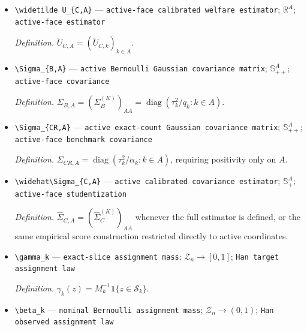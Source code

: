 \documentclass{article}
\begin{document}
\begin{itemize}
  \par\smallskip\noindent\emph{Definition.} \(\widetilde U_C=(\widetilde U_{C,1},\ldots,\widetilde U_{C,K})\).
  \item \texttt{\textbackslash{}\allowbreak{}widetilde U\_\allowbreak{}\{C,\allowbreak{}A\}\allowbreak{}} --- \texttt{active-\allowbreak{}face calibrated welfare estimator}; \(\mathbb R^A\); \texttt{active-\allowbreak{}face estimator}
  \par\smallskip\noindent\emph{Definition.} \(\widetilde U_{C,A}=(\widetilde U_{C,k})_{k\in A}\).
  \item \texttt{\textbackslash{}\allowbreak{}Sigma\_\allowbreak{}\{B,\allowbreak{}A\}\allowbreak{}} --- \texttt{active Bernoulli Gaussian covariance matrix}; \(\mathbb S_{++}^A\); \texttt{active-\allowbreak{}face covariance}
  \par\smallskip\noindent\emph{Definition.} \(\Sigma_{B,A}=(\Sigma_B^{(K)})_{AA}=\operatorname{diag}(\tau_k^2/q_k:k\in A)\).
  \item \texttt{\textbackslash{}\allowbreak{}Sigma\_\allowbreak{}\{CR,\allowbreak{}A\}\allowbreak{}} --- \texttt{active exact-\allowbreak{}count Gaussian covariance matrix}; \(\mathbb S_{++}^A\); \texttt{active-\allowbreak{}face benchmark covariance}
  \par\smallskip\noindent\emph{Definition.} \(\Sigma_{CR,A}=\operatorname{diag}(\tau_k^2/\alpha_k:k\in A)\), requiring positivity only on \(A\).
  \item \texttt{\textbackslash{}\allowbreak{}widehat\textbackslash{}\allowbreak{}Sigma\_\allowbreak{}\{C,\allowbreak{}A\}\allowbreak{}} --- \texttt{active calibrated covariance estimator}; \(\mathbb S_+^A\); \texttt{active-\allowbreak{}face studentization}
  \par\smallskip\noindent\emph{Definition.} \(\widehat\Sigma_{C,A}=(\widehat\Sigma_C^{(K)})_{AA}\) whenever the full estimator is defined, or the same empirical score construction restricted directly to active coordinates.
  \item \texttt{\textbackslash{}\allowbreak{}gamma\_\allowbreak{}k} --- \texttt{exact-\allowbreak{}slice assignment mass}; \(\mathcal Z_n\to[0,1]\); \texttt{Han target assignment law}
  \par\smallskip\noindent\emph{Definition.} \(\gamma_k(z)=M_k^{-1}\mathbf 1\{z\in\mathcal S_k\}\).
  \item \texttt{\textbackslash{}\allowbreak{}beta\_\allowbreak{}k} --- \texttt{nominal Bernoulli assignment mass}; \(\mathcal Z_n\to(0,1)\); \texttt{Han observed assignment law}

\end{itemize}
\end{document}
